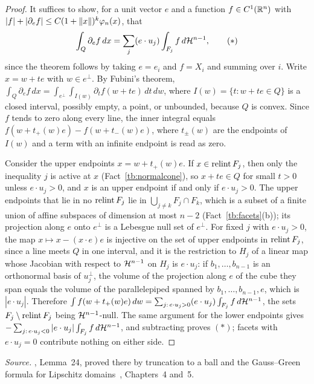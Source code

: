 \begin{proof}
It suffices to show, for a unit vector \(e\) and a function
\(f\in C^1(\mathbb R^n)\) with \(|f|+|\partial_ef|\le C(1+\left\lVert x\right\rVert)^k\varphi_n(x)\),
that
\begin{equation}
 \int_Q\partial_ef\,dx=\sum_j(e\cdot u_j)\int_{F_j}f\,d\mathcal H^{n-1},
 \tag{\(*\)}
\end{equation}
since the theorem follows by taking \(e=e_i\) and \(f=X_i\) and summing over
\(i\). Write \(x=w+te\) with \(w\in e^\perp\). By Fubini's theorem,
\(\int_Q\partial_ef\,dx=\int_{e^\perp}\int_{I(w)}\partial_tf(w+te)\,dt\,dw\),
where \(I(w)=\{t:w+te\in Q\}\) is a closed interval, possibly empty, a point,
or unbounded, because \(Q\) is convex. Since \(f\) tends to zero along every
line, the inner integral equals \(f(w+t_+(w)e)-f(w+t_-(w)e)\), where
\(t_\pm(w)\) are the endpoints of \(I(w)\) and a term with an infinite
endpoint is read as zero.

Consider the upper endpoints \(x=w+t_+(w)e\). If \(x\in\operatorname{relint} F_j\), then
only the inequality \(j\) is active at \(x\) (Fact~\ref{tb:normalcone}), so
\(x+te\in Q\) for small \(t>0\) unless \(e\cdot u_j>0\), and \(x\) is an upper
endpoint if and only if \(e\cdot u_j>0\). The upper endpoints that lie in no
\(\operatorname{relint} F_j\) lie in \(\bigcup_{j\ne k}F_j\cap F_k\), which is a subset of a
finite union of affine subspaces of dimension at most \(n-2\)
(Fact~\ref{tb:facets}(b)); its projection along \(e\) onto \(e^\perp\) is a
Lebesgue null set of \(e^\perp\). For fixed \(j\) with \(e\cdot u_j>0\), the
map \(x\mapsto x-(x\cdot e)e\) is injective on the set of upper endpoints in
\(\operatorname{relint} F_j\), since a line meets \(Q\) in one interval, and it is the
restriction to \(H_j\) of a linear map whose Jacobian with respect to
\(\mathcal H^{n-1}\) on \(H_j\) is \(e\cdot u_j\): if \(b_1,\ldots,b_{n-1}\) is an
orthonormal basis of \(u_j^\perp\), the volume of the projection along \(e\)
of the cube they span equals the volume of the parallelepiped spanned by
\(b_1,\ldots,b_{n-1},e\), which is \(|e\cdot u_j|\). Therefore
\(\int f(w+t_+(w)e)\,dw=\sum_{j:\,e\cdot u_j>0}(e\cdot u_j)\int_{F_j}f\,d\mathcal H^{n-1}\),
the sets \(F_j\setminus\operatorname{relint} F_j\) being \(\mathcal H^{n-1}\)-null. The same
argument for the lower endpoints gives
\(-\sum_{j:\,e\cdot u_j<0}|e\cdot u_j|\int_{F_j}f\,d\mathcal H^{n-1}\), and
subtracting proves \((*)\); facets with \(e\cdot u_j=0\) contribute nothing
on either side.
\end{proof}

\emph{Source.} , Lemma~24, proved there by truncation to a ball and
the Gauss--Green formula for Lipschitz domains~, Chapters~4
and~5.

